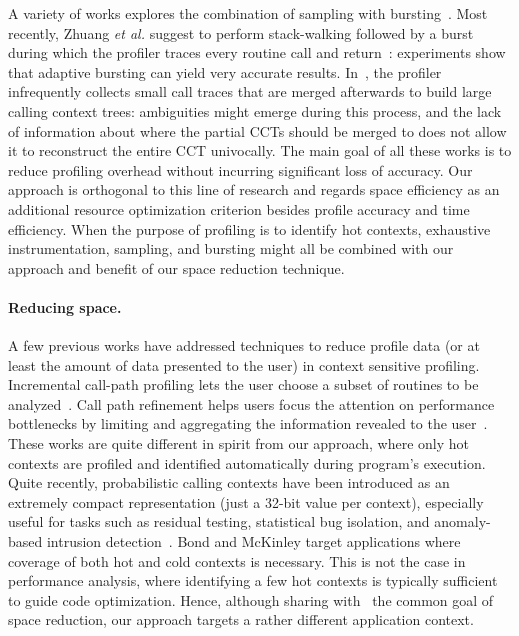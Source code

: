 \documentclass{sigplanconf}
\begin{document}
A variety of works explores the combination of sampling with bursting~\cite{AR01, HC01, ZSCC06}. Most recently, Zhuang {\em et al.} suggest to perform stack-walking followed by a burst during which the profiler traces every routine call and return~\cite{ZSCC06}: experiments show that adaptive bursting can yield very accurate results. In~\cite{SZ09}, the profiler infrequently collects small call traces that are merged afterwards to build large calling context trees: ambiguities might emerge during this process, and the lack of information about where the partial CCTs should be merged to does not allow it to reconstruct the entire CCT univocally.
The main goal of all these works is to reduce profiling overhead without incurring significant loss of accuracy. 
Our approach is orthogonal to this line of research and regards space efficiency as an additional resource optimization criterion besides profile accuracy and time efficiency. When the purpose of profiling is to identify hot contexts, exhaustive instrumentation, sampling, and bursting might all be combined with our approach and benefit of our space reduction technique.

\paragraph{Reducing space.} A few previous works have addressed techniques to reduce profile data (or at least the amount of data presented to the user) in context sensitive profiling. Incremental call-path profiling lets the user choose a subset of routines to be analyzed~\cite{BM04}. Call path refinement helps users focus the attention on performance bottlenecks by limiting and aggregating the information revealed to the user~\cite{H95}. These works are quite different in spirit from our approach, where only hot contexts are profiled and identified automatically during program's execution. Quite recently, probabilistic calling contexts have been introduced as an extremely compact representation (just a 32-bit value per context), especially useful for tasks such as residual testing, statistical bug isolation, and anomaly-based intrusion detection~\cite{BM07}. Bond and McKinley target applications where coverage of both hot and cold contexts is necessary. This is not the case in performance analysis, where identifying a few hot contexts is typically sufficient to guide code optimization. Hence, although sharing with~\cite{BM07} the common goal of space reduction, our approach targets a rather different application context.
\end{document}
